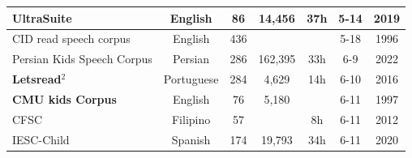 \begin{table}
\begin{tabular}{l|c|c|c|c|c|c}
UltraSuite\cite{eshky2019ultrasuite} & English & 86 & 14,456 & 37h & 5-14 & 2019 \\ 
\hline
CID read speech corpus \cite{lee1999acoustics} & English & 436 &  &  & 5-18 & 1996 \\ 
\hline
Persian Kids Speech Corpus \cite{khanzadi2022persian} & Persian & 286 & 162,395 & 33h & 6-9 & 2022 \\ 
\hline
\textbf{Letsread$^2$} \cite{letsread} & Portuguese & 284 & 4,629 & 14h & 6-10 & 2016 \\ 
\hline
\textbf{CMU kids Corpus} \cite{cmu} & English & 76 & 5,180 &  & 6-11 & 1997 \\ 
\hline
CFSC \cite{CFSC} & Filipino & 57 &  & 8h & 6-11 & 2012 \\ 
\hline
IESC-Child \cite{PEREZESPINOSA202055} & Spanish & 174 & 19,793 & 34h & 6-11 & 2020 \\ 
\hline


\end{tabular}
\end{table}
